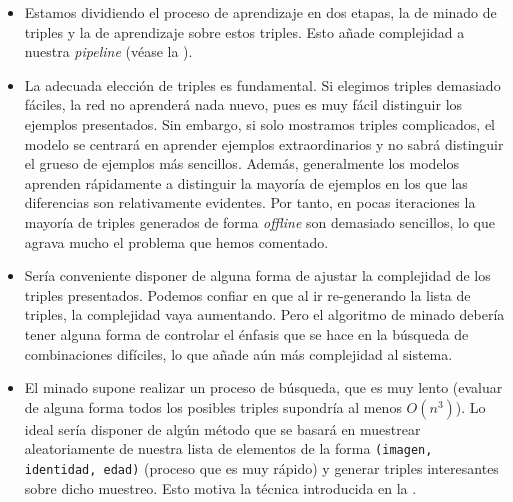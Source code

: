 \begin{itemize}
	\item Estamos dividiendo el proceso de aprendizaje en dos etapas, la de minado de triples y la de aprendizaje sobre estos triples. Esto añade complejidad a nuestra \textit{pipeline} (véase la ).
	\item La adecuada elección de triples es fundamental. Si elegimos triples demasiado fáciles, la red no aprenderá nada nuevo, pues es muy fácil distinguir los ejemplos presentados. Sin embargo, si solo mostramos triples complicados, el modelo se centrará en aprender ejemplos extraordinarios y no sabrá distinguir el grueso de ejemplos más sencillos. Además, generalmente los modelos aprenden rápidamente a distinguir la mayoría de ejemplos en los que las diferencias son relativamente evidentes. Por tanto, en pocas iteraciones la mayoría de triples generados de forma \textit{offline} son demasiado sencillos, lo que agrava mucho el problema que hemos comentado.
	\item Sería conveniente disponer de alguna forma de ajustar la complejidad de los triples presentados. Podemos confiar en que al ir re-generando la lista de triples, la complejidad vaya aumentando. Pero el algoritmo de minado debería tener alguna forma de controlar el énfasis que se hace en la búsqueda de combinaciones difíciles, lo que añade aún más complejidad al sistema.
	\item El minado supone realizar un proceso de búsqueda, que es muy lento (evaluar de alguna forma todos los posibles triples supondría al menos $O(n^3)$). Lo ideal sería disponer de algún método que se basará en muestrear aleatoriamente de nuestra lista de elementos de la forma \lstinline{(imagen, identidad, edad)} (proceso que es muy rápido) y generar triples interesantes sobre dicho muestreo. Esto motiva la técnica introducida en la .
\end{itemize}
